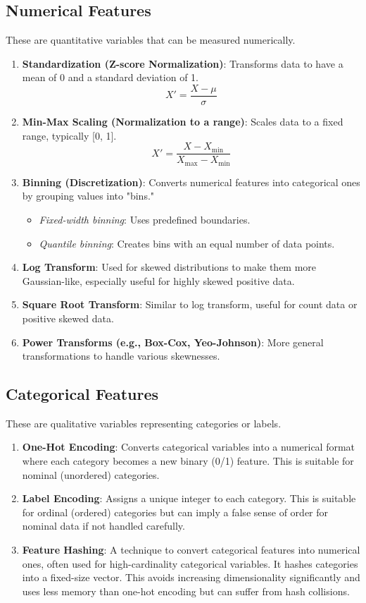 \documentclass{article}
\begin{document}
\subsection*{Numerical Features}
These are quantitative variables that can be measured numerically.
\begin{enumerate}
    \item \textbf{Standardization (Z-score Normalization)}: Transforms data to have a mean of 0 and a standard deviation of 1.
    \begin{equation*}
    X' = \frac{X - \mu}{\sigma}
    \end{equation*}
    \item \textbf{Min-Max Scaling (Normalization to a range)}: Scales data to a fixed range, typically [0, 1].
    \begin{equation*}
    X' = \frac{X - X_{\text{min}}}{X_{\text{max}} - X_{\text{min}}}
    \end{equation*}
    \item \textbf{Binning (Discretization)}: Converts numerical features into categorical ones by grouping values into "bins."
    \begin{itemize}
        \item \textit{Fixed-width binning}: Uses predefined boundaries.
        \item \textit{Quantile binning}: Creates bins with an equal number of data points.
    \end{itemize}
    \item \textbf{Log Transform}: Used for skewed distributions to make them more Gaussian-like, especially useful for highly skewed positive data.
    \item \textbf{Square Root Transform}: Similar to log transform, useful for count data or positive skewed data.
    \item \textbf{Power Transforms (e.g., Box-Cox, Yeo-Johnson)}: More general transformations to handle various skewnesses.
\end{enumerate}

\subsection*{Categorical Features}
These are qualitative variables representing categories or labels.
\begin{enumerate}
    \item \textbf{One-Hot Encoding}: Converts categorical variables into a numerical format where each category becomes a new binary (0/1) feature. This is suitable for nominal (unordered) categories.
    \item \textbf{Label Encoding}: Assigns a unique integer to each category. This is suitable for ordinal (ordered) categories but can imply a false sense of order for nominal data if not handled carefully.
    \item \textbf{Feature Hashing}: A technique to convert categorical features into numerical ones, often used for high-cardinality categorical variables. It hashes categories into a fixed-size vector. This avoids increasing dimensionality significantly and uses less memory than one-hot encoding but can suffer from hash collisions.
\end{enumerate}
\end{document}
